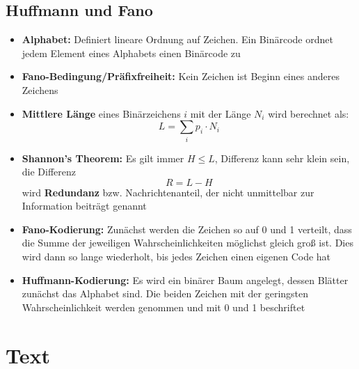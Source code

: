 \documentclass[12pt,landscape]{article}
\begin{document}
\begin{multicols}{3}
\subsection{Huffmann und Fano}
\begin{itemize}
\item \textbf{Alphabet:} Definiert lineare Ordnung auf Zeichen. Ein Binärcode ordnet jedem Element eines Alphabets einen Binärcode zu
\item \textbf{Fano-Bedingung/Präfixfreiheit:} Kein Zeichen ist Beginn eines anderes Zeichens
\item \textbf{Mittlere Länge} eines Binärzeichens $i$ mit der Länge $N_i$ wird berechnet als: \[L = \sum_{i} p_i \cdot N_i\] 
\item \textbf{Shannon's Theorem:} Es gilt immer $H \leq L$, Differenz kann sehr klein sein, die Differenz \[R = L - H\] wird \textbf{Redundanz} bzw. Nachrichtenanteil, der nicht unmittelbar zur Information beiträgt genannt
\item \textbf{Fano-Kodierung:} Zunächst werden die Zeichen so auf 0 und 1 verteilt, dass die Summe der jeweiligen Wahrscheinlichkeiten möglichst gleich groß ist. Dies wird dann so lange wiederholt, bis jedes Zeichen einen eigenen Code hat
\item \textbf{Huffmann-Kodierung:} Es wird ein binärer Baum angelegt, dessen Blätter zunächst das Alphabet sind. Die beiden Zeichen mit der geringsten Wahrscheinlichkeit werden genommen und mit 0 und 1 beschriftet
\end{itemize}
\section{Text}

\end{multicols}
\end{document}
